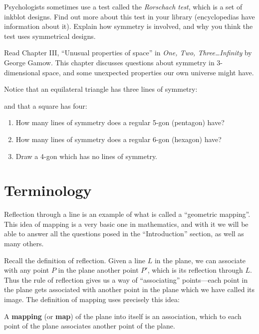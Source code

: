 \documentclass[12pt]{book} %
\begin{document}
\begin{ExerciseList}
\begin{ExerciseList}
\Exercise Psychologists sometimes use a test called the \textit{Rorschach test}, which is a set of inkblot designs. Find out more about this test in your library (encyclopedias have information about it). Explain how symmetry is involved, and why you think the test uses symmetrical designs.

\Exercise Read Chapter III, ``Unusual properties of space'' in \textit{One, Two, Three\ldots Infinity} by George Gamow. This chapter discusses questions about symmetry in 3-dimensional space, and some unexpected properties our own universe might have.

\Exercise Notice that an equilateral triangle has three lines of symmetry:


and that a square has four:


\begin{enumerate}
\item[(a)] How many lines of symmetry does a regular 5-gon (pentagon) have?
\item[(b)] How many lines of symmetry does a regular 6-gon (hexagon) have?
\item[(c)] Draw a 4-gon which has no lines of symmetry.
\end{enumerate}
\end{ExerciseList}

\section{Terminology}

Reflection through a line is an example of what is called a ``geometric mapping''. This idea of mapping is a very basic one in mathematics, and with it we will be able to answer all the questions posed in the ``Introduction'' section, as well as many others.

Recall the definition of reflection. Given a line $L$ in the plane, we can associate with any point $P$ in the plane another point $P'$, which is its reflection through $L$. Thus the rule of reflection gives us a way of ``associating'' points---each point in the plane gets associated with another point in the plane which we have called its image. The definition of mapping uses precisely this idea:

A \textbf{mapping} (or \textbf{map}) of the plane into itself is an association, which to each point of the plane associates another point of the plane.


\end{ExerciseList}
\end{document}
